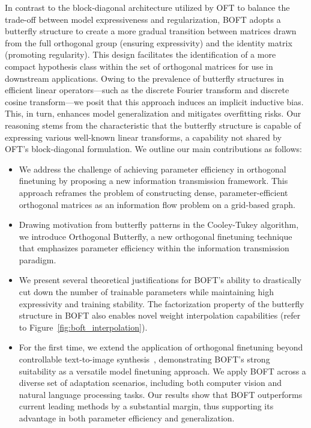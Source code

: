 In contrast to the block-diagonal architecture utilized by OFT to balance the trade-off between model expressiveness and regularization, BOFT adopts a butterfly structure to create a more gradual transition between matrices drawn from the full orthogonal group (ensuring expressivity) and the identity matrix (promoting regularity). This design facilitates the identification of a more compact hypothesis class within the set of orthogonal matrices for use in downstream applications. Owing to the prevalence of butterfly structures in efficient linear operators—such as the discrete Fourier transform and discrete cosine transform—we posit that this approach induces an implicit inductive bias. This, in turn, enhances model generalization and mitigates overfitting risks. Our reasoning stems from the characteristic that the butterfly structure is capable of expressing various well-known linear transforms, a capability not shared by OFT’s block-diagonal formulation. We outline our main contributions as follows:

\begin{itemize}[leftmargin=*,nosep]
    \item We address the challenge of achieving parameter efficiency in orthogonal finetuning by proposing a new information transmission framework. This approach reframes the problem of constructing dense, parameter-efficient orthogonal matrices as an information flow problem on a grid-based graph.
    \item Drawing motivation from butterfly patterns in the Cooley-Tukey algorithm, we introduce Orthogonal Butterfly, a new orthogonal finetuning technique that emphasizes parameter efficiency within the information transmission paradigm.
    \item We present several theoretical justifications for BOFT’s ability to drastically cut down the number of trainable parameters while maintaining high expressivity and training stability. The factorization property of the butterfly structure in BOFT also enables novel weight interpolation capabilities (refer to Figure~\ref{fig:boft_interpolation}).
    \item For the first time, we extend the application of orthogonal finetuning beyond controllable text-to-image synthesis~\cite{qiu2023controlling}, demonstrating BOFT’s strong suitability as a versatile model finetuning approach. We apply BOFT across a diverse set of adaptation scenarios, including both computer vision and natural language processing tasks. Our results show that BOFT outperforms current leading methods by a substantial margin, thus supporting its advantage in both parameter efficiency and generalization.
\end{itemize}

